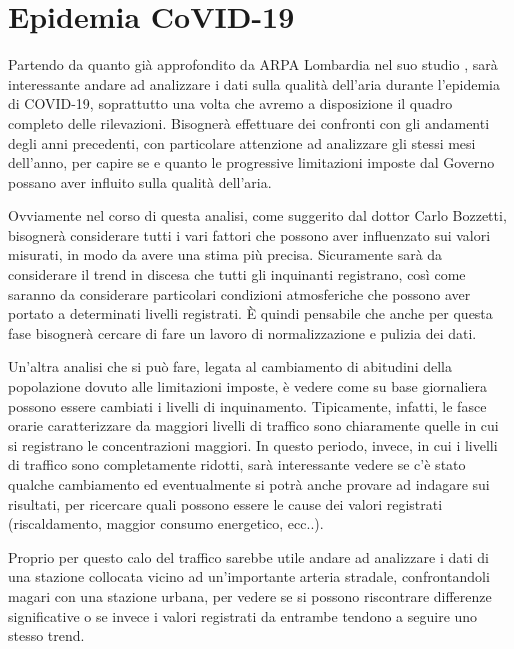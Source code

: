 \documentclass{article}
\begin{document}
\section{Epidemia CoVID-19}
Partendo da quanto già approfondito da ARPA Lombardia nel suo studio \cite{arpaCovid}, sarà interessante andare ad analizzare i dati sulla qualità dell'aria durante l'epidemia di COVID-19, soprattutto una volta che avremo a disposizione il quadro completo delle rilevazioni. Bisognerà effettuare dei confronti con gli andamenti degli anni precedenti, con particolare attenzione ad analizzare gli stessi mesi dell'anno, per capire se e quanto le progressive limitazioni imposte dal Governo possano aver influito sulla qualità dell'aria.

Ovviamente nel corso di questa analisi, come suggerito dal dottor Carlo Bozzetti, bisognerà considerare tutti i vari fattori che possono aver influenzato sui valori misurati, in modo da avere una stima più precisa. Sicuramente sarà da considerare il trend in discesa che tutti gli inquinanti registrano, così come saranno da considerare particolari condizioni atmosferiche che possono aver portato a determinati livelli registrati. È quindi pensabile che anche per questa fase bisognerà cercare di fare un lavoro di normalizzazione e pulizia dei dati.

Un'altra analisi che si può fare, legata al cambiamento di abitudini della popolazione dovuto alle limitazioni imposte, è vedere come su base giornaliera possono essere cambiati i livelli di inquinamento. Tipicamente, infatti, le fasce orarie caratterizzare da maggiori livelli di traffico sono chiaramente quelle in cui si registrano le concentrazioni maggiori. In questo periodo, invece, in cui i livelli di traffico sono completamente ridotti, sarà interessante vedere se c'è stato qualche cambiamento ed eventualmente si potrà anche provare ad indagare sui risultati, per ricercare quali possono essere le cause dei valori registrati (riscaldamento, maggior consumo energetico, ecc..).

Proprio per questo calo del traffico sarebbe utile andare ad analizzare i dati di una stazione collocata vicino ad un'importante arteria stradale, confrontandoli magari con una stazione urbana, per vedere se si possono riscontrare differenze significative o se invece i valori registrati da entrambe tendono a seguire uno stesso trend.
\end{document}

